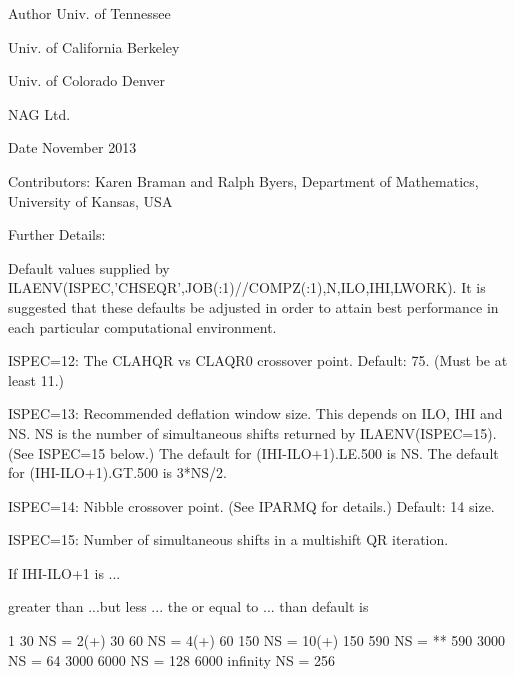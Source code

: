 \begin{DoxyAuthor}{Author}
Univ. of Tennessee 

Univ. of California Berkeley 

Univ. of Colorado Denver 

N\+A\+G Ltd. 
\end{DoxyAuthor}
\begin{DoxyDate}{Date}
November 2013 
\end{DoxyDate}
\begin{DoxyParagraph}{Contributors\+: }
Karen Braman and Ralph Byers, Department of Mathematics, University of Kansas, U\+S\+A 
\end{DoxyParagraph}
\begin{DoxyParagraph}{Further Details\+: }
\begin{DoxyVerb}             Default values supplied by
             ILAENV(ISPEC,'CHSEQR',JOB(:1)//COMPZ(:1),N,ILO,IHI,LWORK).
             It is suggested that these defaults be adjusted in order
             to attain best performance in each particular
             computational environment.

            ISPEC=12: The CLAHQR vs CLAQR0 crossover point.
                      Default: 75. (Must be at least 11.)

            ISPEC=13: Recommended deflation window size.
                      This depends on ILO, IHI and NS.  NS is the
                      number of simultaneous shifts returned
                      by ILAENV(ISPEC=15).  (See ISPEC=15 below.)
                      The default for (IHI-ILO+1).LE.500 is NS.
                      The default for (IHI-ILO+1).GT.500 is 3*NS/2.

            ISPEC=14: Nibble crossover point. (See IPARMQ for
                      details.)  Default: 14%
                      size.

            ISPEC=15: Number of simultaneous shifts in a multishift
                      QR iteration.

                      If IHI-ILO+1 is ...

                      greater than      ...but less    ... the
                      or equal to ...      than        default is

                           1               30          NS =   2(+)
                          30               60          NS =   4(+)
                          60              150          NS =  10(+)
                         150              590          NS =  **
                         590             3000          NS =  64
                        3000             6000          NS = 128
                        6000             infinity      NS = 256


\end{DoxyVerb}
\end{DoxyParagraph}
